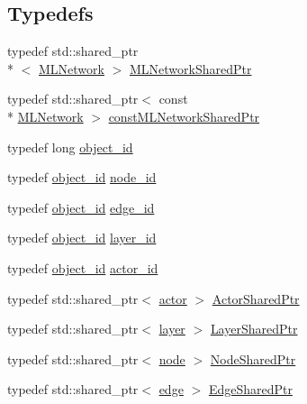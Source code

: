\subsection*{Typedefs}
\begin{DoxyCompactItemize}
\item 
typedef std\+::shared\+\_\+ptr\\*
$<$ \hyperlink{classmlnet_1_1_m_l_network}{M\+L\+Network} $>$ \hyperlink{namespacemlnet_aa6d3fa87865bcde4d1283abb1942cbbb}{M\+L\+Network\+Shared\+Ptr}
\item 
typedef std\+::shared\+\_\+ptr$<$ const \\*
\hyperlink{classmlnet_1_1_m_l_network}{M\+L\+Network} $>$ \hyperlink{namespacemlnet_ae262c8b9dd013ed449c114a5dfba5743}{const\+M\+L\+Network\+Shared\+Ptr}
\item 
typedef long \hyperlink{namespacemlnet_a318fc9bfdb74e1da4d44d0c50d4a453d}{object\+\_\+id}
\item 
typedef \hyperlink{namespacemlnet_a318fc9bfdb74e1da4d44d0c50d4a453d}{object\+\_\+id} \hyperlink{namespacemlnet_a4c354f08ca868982bf3ddae882ff71c6}{node\+\_\+id}
\item 
typedef \hyperlink{namespacemlnet_a318fc9bfdb74e1da4d44d0c50d4a453d}{object\+\_\+id} \hyperlink{namespacemlnet_ad708e58e72680351e102e6b3d0489145}{edge\+\_\+id}
\item 
typedef \hyperlink{namespacemlnet_a318fc9bfdb74e1da4d44d0c50d4a453d}{object\+\_\+id} \hyperlink{namespacemlnet_a84ad9c6056f0eb7d129995351f9b13fb}{layer\+\_\+id}
\item 
typedef \hyperlink{namespacemlnet_a318fc9bfdb74e1da4d44d0c50d4a453d}{object\+\_\+id} \hyperlink{namespacemlnet_a1d557bff46b627f1d7f6ff613302bba5}{actor\+\_\+id}
\item 
typedef std\+::shared\+\_\+ptr$<$ \hyperlink{classmlnet_1_1actor}{actor} $>$ \hyperlink{namespacemlnet_a714fd98ffaeaadd5c38d61fa53dc4d24}{Actor\+Shared\+Ptr}
\item 
typedef std\+::shared\+\_\+ptr$<$ \hyperlink{classmlnet_1_1layer}{layer} $>$ \hyperlink{namespacemlnet_a10c007fb811c55339dd5b9d32bb0505d}{Layer\+Shared\+Ptr}
\item 
typedef std\+::shared\+\_\+ptr$<$ \hyperlink{classmlnet_1_1node}{node} $>$ \hyperlink{namespacemlnet_acf8b1b6deb52e7dacfc676c689f9a10c}{Node\+Shared\+Ptr}
\item 
typedef std\+::shared\+\_\+ptr$<$ \hyperlink{classmlnet_1_1edge}{edge} $>$ \hyperlink{namespacemlnet_a33e88c3df9bea691a269d5e5d8bea57d}{Edge\+Shared\+Ptr}
\item 

\end{DoxyCompactItemize}
